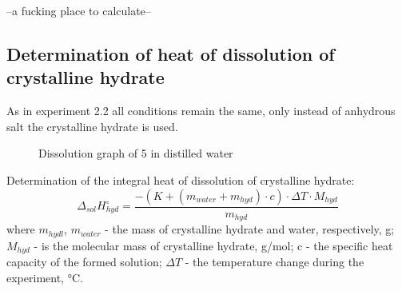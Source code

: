 \documentclass[12pt, letterpaper]{article}
\begin{document}
        --a fucking place to calculate--
       

        \subsection*{Determination of heat of dissolution of crystalline hydrate}
        \hspace{4mm} As in experiment 2.2 all conditions remain the same, only instead of anhydrous salt the crystalline hydrate is used.
        \begin{figure}[h]
            \centering
             \caption{Dissolution graph of 5  in distilled water}
        \end{figure}
        Determination of the integral heat of dissolution of crystalline hydrate:
         \begin{equation}
            \Delta_{sol}H^\circ_{hyd} = \frac{-(K + (m_{water} + m_{hyd}) \cdot c) \cdot \Delta T \cdot M_{hyd}}{m_{hyd}}
        \end{equation}
         where $ m_{hydl}$, $m_{water}$ - the mass of crystalline hydrate  and water, respectively, g; $M_{hyd}$ - is the molecular mass of crystalline hydrate, g/mol; c - the specific heat capacity of the formed solution; $\Delta T$ - the temperature change during the experiment, °C. \\
\end{document}
